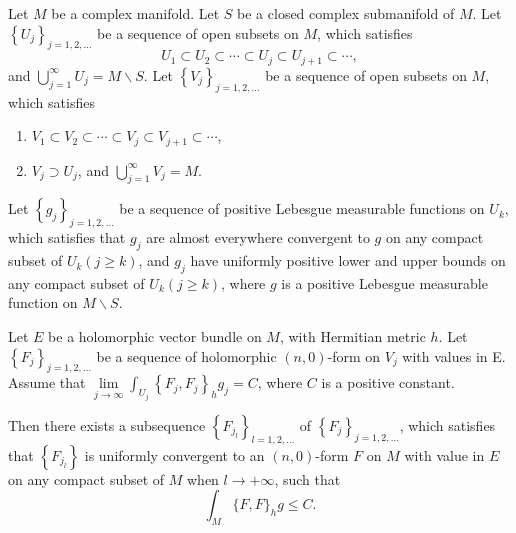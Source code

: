 \begin{lem}\label{l:lim_unbounded}
  Let $M$ be a complex manifold. Let $S$ be a closed complex submanifold of $M$. Let $\left\{U_j\right\}_{j=1,2, \ldots}$ be a sequence of open subsets on $M$, which satisfies
$$
U_1 \subset U_2 \subset \cdots \subset U_j \subset U_{j+1} \subset \cdots,
$$
and $\bigcup_{j=1}^{\infty} U_j=M \backslash S$. Let $\left\{V_j\right\}_{j=1,2, \ldots}$ be a sequence of open subsets on $M$, which satisfies
\begin{enumerate}
  \item $V_1 \subset V_2 \subset \cdots \subset V_j \subset V_{j+1} \subset \cdots$,
  \item $V_j \supset U_j $, and $\bigcup_{j=1}^{\infty} V_j=M$.
\end{enumerate}

Let $\left\{g_j\right\}_{j=1,2, \ldots}$ be a sequence of positive Lebesgue measurable functions on $U_k$, which satisfies that $g_j$ are almost everywhere convergent to $g$ on any compact subset of $U_k(j \geq k)$, and $g_j$ have uniformly positive lower and upper bounds on any compact subset of $U_k(j \geq k)$, where $g$ is a positive Lebesgue measurable function on $M \backslash S$.

Let $E$ be a holomorphic vector bundle on $M$, with Hermitian metric $h$. Let $\left\{F_j\right\}_{j=1,2, \ldots}$ be a sequence of holomorphic $(n, 0)$-form on $V_j$ with values in E. Assume that $\lim \limits_{j \rightarrow \infty} \int_{U_j}\left\{F_j, F_j\right\}_h g_j=C$, where $C$ is a positive constant.

Then there exists a subsequence $\left\{F_{j_l}\right\}_{l=1,2, \ldots}$ of $\left\{F_j\right\}_{j=1,2, \ldots}$, which satisfies that $\left\{F_{j_l}\right\}$ is uniformly convergent to an $(n, 0)$-form $F$ on $M$ with value in $E$ on any compact subset of $M$ when $l \rightarrow+\infty$, such that
$$
\int_M\{F, F\}_h g \leq C .
$$
\end{lem}

